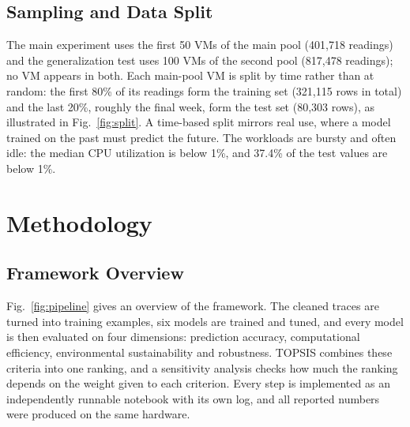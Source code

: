 \documentclass[conference,letterpaper,10pt]{IEEEtran}
\begin{document}
\subsection{Sampling and Data Split}
The main experiment uses the first 50 VMs of the main pool (401{,}718 readings) and the generalization test uses 100 VMs of the second pool (817{,}478 readings); no VM appears in both. Each main-pool VM is split by time rather than at random: the first 80\% of its readings form the training set (321{,}115 rows in total) and the last 20\%, roughly the final week, form the test set (80{,}303 rows), as illustrated in Fig.~\ref{fig:split}. A time-based split mirrors real use, where a model trained on the past must predict the future. The workloads are bursty and often idle: the median CPU utilization is below 1\%, and 37.4\% of the test values are below 1\%.

\section{Methodology}
\label{sec:method}

\subsection{Framework Overview}
Fig.~\ref{fig:pipeline} gives an overview of the framework. The cleaned traces are turned into training examples, six models are trained and tuned, and every model is then evaluated on four dimensions: prediction accuracy, computational efficiency, environmental sustainability and robustness. TOPSIS combines these criteria into one ranking, and a sensitivity analysis checks how much the ranking depends on the weight given to each criterion. Every step is implemented as an independently runnable notebook with its own log, and all reported numbers were produced on the same hardware.
\end{document}

